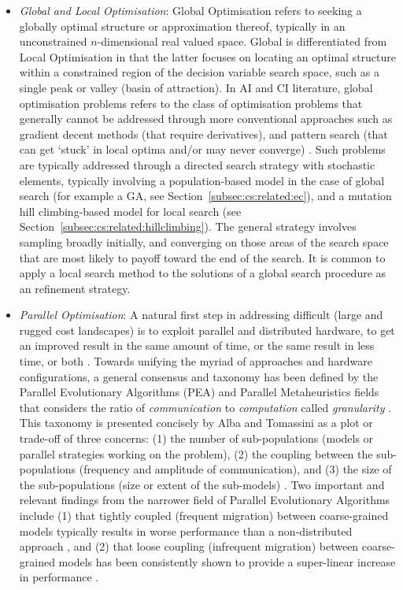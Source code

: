 \begin{itemize}
	
	\item \emph{Global and Local Optimisation}: Global Optimisation refers to seeking a globally optimal structure or approximation thereof, typically in an unconstrained $n$-dimensional real valued space. Global is differentiated from Local Optimisation in that the latter focuses on locating an optimal structure within a constrained region of the decision variable search space, such as a single peak or valley (basin of attraction). In AI and CI literature, global optimisation problems refers to the class of optimisation problems that generally cannot be addressed through more conventional approaches such as gradient decent methods (that require derivatives), and pattern search (that can get `stuck' in local optima and/or may never converge) \cite{Price1977, Toern1999}. Such problems are typically addressed through a directed search strategy with stochastic elements, typically involving a population-based model in the case of global search (for example a GA, see Section~\ref{subsec:cs:related:ec}), and a mutation hill climbing-based model for local search (see Section~\ref{subsec:cs:related:hillclimbing}). The general strategy involves sampling broadly initially, and converging on those areas of the search space that are most likely to payoff toward the end of the search. It is common to apply a local search method to the solutions of a global search procedure as an refinement strategy.
	
	\item \emph{Parallel Optimisation}: A natural first step in addressing difficult (large and rugged cost landscapes) is to exploit parallel and distributed hardware, to get an improved result in the same amount of time, or the same result in less time, or both \cite{Crainic2005}. Towards unifying the myriad of approaches and hardware configurations, a general consensus and taxonomy has been defined by the Parallel Evolutionary Algorithms (PEA) and Parallel Metaheuristics fields that considers the ratio of \emph{communication} to \emph{computation} called \emph{granularity} \cite{Cantu-Paz2000, Alba2005a}. This taxonomy is presented concisely by Alba and Tomassini as a plot or trade-off of three concerns: (1) the number of sub-populations (models or parallel strategies working on the problem), (2) the coupling between the sub-populations (frequency and amplitude of communication), and (3) the size of the sub-populations (size or extent of the sub-models) \cite{Alba2002}. Two important and relevant findings from the narrower field of Parallel Evolutionary Algorithms include (1) that tightly coupled (frequent migration) between coarse-grained models typically results in worse performance than a non-distributed approach \cite{Alba2000}, and (2) that loose coupling (infrequent migration) between coarse-grained models has been consistently shown to provide a super-linear increase in performance \cite{Alba2002a, Belding1995, Cantu-Paz2000}.
	

\end{itemize}
